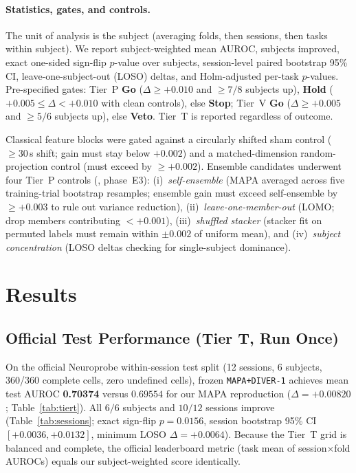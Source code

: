 \documentclass[11pt]{article}
\begin{document}
\paragraph{Statistics, gates, and controls.}
The unit of analysis is the subject (averaging folds, then sessions, then tasks within subject). We report subject-weighted mean AUROC, subjects improved, exact one-sided sign-flip $p$-value over subjects, session-level paired bootstrap 95\% CI, leave-one-subject-out (LOSO) deltas, and Holm-adjusted per-task $p$-values. Pre-specified gates: Tier~P \textbf{Go} ($\Delta\ge+0.010$ and $\ge 7/8$ subjects up), \textbf{Hold} ($+0.005\le\Delta<+0.010$ with clean controls), else \textbf{Stop}; Tier~V \textbf{Go} ($\Delta\ge+0.005$ and $\ge 5/6$ subjects up), else \textbf{Veto}. Tier~T is reported regardless of outcome.

Classical feature blocks were gated against a circularly shifted sham control ($\ge 30$\,s shift; gain must stay below $+0.002$) and a matched-dimension random-projection control (must exceed by $\ge +0.002$). Ensemble candidates underwent four Tier~P controls (, phase~E3): (i)~\emph{self-ensemble} (MAPA averaged across five training-trial bootstrap resamples; ensemble gain must exceed self-ensemble by $\ge +0.003$ to rule out variance reduction), (ii)~\emph{leave-one-member-out} (LOMO; drop members contributing $<+0.001$), (iii)~\emph{shuffled stacker} (stacker fit on permuted labels must remain within $\pm 0.002$ of uniform mean), and (iv)~\emph{subject concentration} (LOSO deltas checking for single-subject dominance).

\section{Results}

\subsection{Official Test Performance (Tier T, Run Once)}
On the official Neuroprobe within-session test split (12 sessions, 6 subjects, 360/360 complete cells, zero undefined cells), frozen \texttt{MAPA+DIVER-1} achieves mean test AUROC \textbf{0.70374} versus $0.69554$ for our MAPA reproduction ($\Delta=+0.00820$; Table~\ref{tab:tiert}). All $6/6$ subjects and $10/12$ sessions improve (Table~\ref{tab:sessions}; exact sign-flip $p=0.0156$, session bootstrap 95\% CI $[+0.0036,+0.0132]$, minimum LOSO $\Delta=+0.0064$). Because the Tier~T grid is balanced and complete, the official leaderboard metric (task mean of session$\times$fold AUROCs) equals our subject-weighted score identically.
\end{document}
